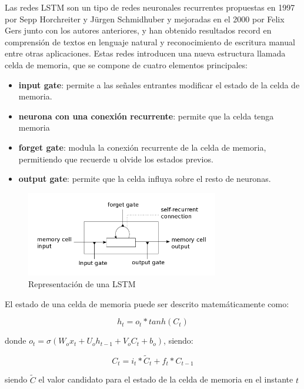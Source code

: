 Las redes LSTM son un tipo de redes neuronales recurrentes propuestas en 1997 por Sepp Horchreiter y Jürgen Schmidhuber y mejoradas en el 2000 por Felix Gers junto con los autores anteriores, y han obtenido resultados record en comprensión de textos en lenguaje natural y reconocimiento de escritura manual entre otras aplicaciones. Estas redes introducen una nueva estructura llamada celda de memoria, que se compone de cuatro elementos principales:
\begin{itemize}
	\item \textbf{input gate}: permite a las señales entrantes modificar el estado de la celda de memoria.
	\item \textbf{neurona con una conexión recurrente}: permite que la celda tenga memoria
	\item \textbf{forget gate}: modula la conexión recurrente de la celda de memoria, permitiendo que recuerde u olvide los estados previos.
	\item \textbf{output gate}: permite que la celda influya sobre el resto de neuronas.
\end{itemize}

\begin{figure}[!ht]
	\centering
	\includegraphics[width=0.75\textwidth]{imaxes/lstm.png}
	\caption{Representación de una LSTM}
	\label{lstm}
\end{figure}

El estado de una celda de memoria puede ser descrito matemáticamente como:

\begin{equation}
h_t = o_t*tanh(C_t)
\end{equation}

donde \(o_t = \sigma(W_ox_t + U_oh_{t-1} + V_oC_t + b_o)\), siendo:

\begin{equation}
C_t = i_t * \widetilde{C}_t + f_t*C_{t-1}
\end{equation}

siendo \(\widetilde{C}\) el valor candidato para el estado de la celda de memoria en el instante \(t\)

